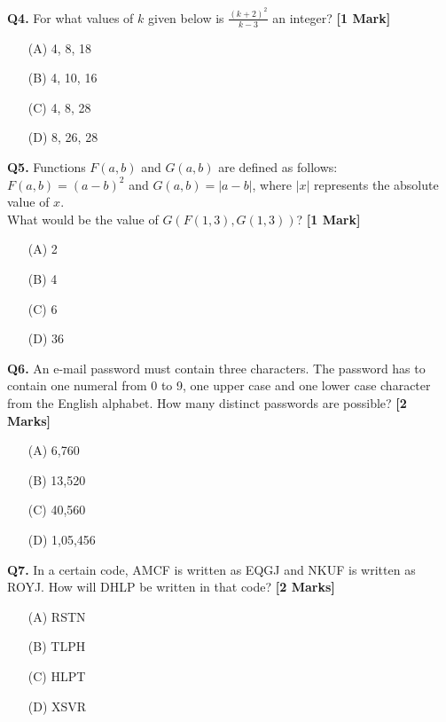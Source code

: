 \documentclass[11pt]{article}
\newcommand{\questiona}[2]{
    \noindent\textbf{Q#2.} #1 \hfill \textbf{[1 Mark]}
}
\newcommand{\questionb}[2]{
    \noindent\textbf{Q#2.} #1 \hfill \textbf{[2 Marks]}
}
\begin{document}
\questiona{For what values of \( k \) given below is \( \frac{(k+2)^2}{k-3} \) an integer?}{4}
\begin{enumerate}
    \item[(A)] 4, 8, 18
    \item[(B)] 4, 10, 16
    \item[(C)] 4, 8, 28
    \item[(D)] 8, 26, 28
\end{enumerate}
\vspace{0.5cm}

\questiona{Functions \( F(a, b) \) and \( G(a, b) \) are defined as follows: \\
\( F(a, b) = (a - b)^2 \) and \( G(a, b) = |a - b| \), where \( |x| \) represents the absolute value of \( x \). \\
What would be the value of \( G(F(1, 3), G(1, 3)) \)?}{5}
\begin{enumerate}
    \item[(A)] 2
    \item[(B)] 4
    \item[(C)] 6
    \item[(D)] 36
\end{enumerate}
\vspace{0.5cm}

\questionb{An e-mail password must contain three characters. The password has to contain one numeral from 0 to 9, one upper case and one lower case character from the English alphabet. How many distinct passwords are possible?}{6}
\begin{enumerate}
    \item[(A)] 6,760
    \item[(B)] 13,520
    \item[(C)] 40,560
    \item[(D)] 1,05,456
\end{enumerate}
\vspace{0.5cm}

\questionb{In a certain code, AMCF is written as EQGJ and NKUF is written as ROYJ. How will DHLP be written in that code?}{7}
\begin{enumerate}
    \item[(A)] RSTN
    \item[(B)] TLPH
    \item[(C)] HLPT
    \item[(D)] XSVR
\end{enumerate}
\vspace{0.5cm}
\end{document}

